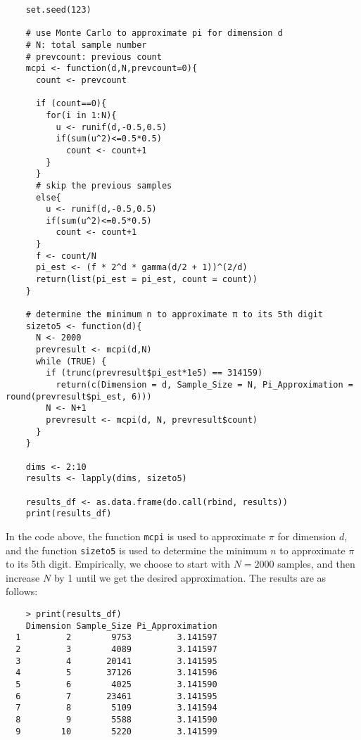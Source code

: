 \documentclass[UTF8]{ctexart}
\begin{document}
\begin{lstlisting}
    set.seed(123)

    # use Monte Carlo to approximate pi for dimension d
    # N: total sample number
    # prevcount: previous count
    mcpi <- function(d,N,prevcount=0){
      count <- prevcount
      
      if (count==0){
        for(i in 1:N){
          u <- runif(d,-0.5,0.5)
          if(sum(u^2)<=0.5*0.5)
            count <- count+1
        }
      }
      # skip the previous samples
      else{
        u <- runif(d,-0.5,0.5)
        if(sum(u^2)<=0.5*0.5)
          count <- count+1
      }
      f <- count/N
      pi_est <- (f * 2^d * gamma(d/2 + 1))^(2/d)
      return(list(pi_est = pi_est, count = count))
    }
    
    # determine the minimum n to approximate π to its 5th digit
    sizeto5 <- function(d){
      N <- 2000
      prevresult <- mcpi(d,N)
      while (TRUE) {
        if (trunc(prevresult$pi_est*1e5) == 314159)
          return(c(Dimension = d, Sample_Size = N, Pi_Approximation = round(prevresult$pi_est, 6)))
        N <- N+1
        prevresult <- mcpi(d, N, prevresult$count)
      }
    }
    
    dims <- 2:10
    results <- lapply(dims, sizeto5)
    
    results_df <- as.data.frame(do.call(rbind, results))
    print(results_df)
\end{lstlisting}
In the code above, the function \texttt{mcpi} is used to approximate $\pi$ for dimension $d$, and the function \texttt{sizeto5} is used to determine the minimum $n$ to approximate $\pi$ to its 5th digit. Empirically, we
choose to start with $N = 2000$ samples, and then increase $N$ by 1 until we get the desired approximation. The results are as follows:
\begin{lstlisting}
    > print(results_df)
    Dimension Sample_Size Pi_Approximation
  1         2        9753         3.141597
  2         3        4089         3.141597
  3         4       20141         3.141595
  4         5       37126         3.141596
  5         6        4025         3.141590
  6         7       23461         3.141595
  7         8        5109         3.141594
  8         9        5588         3.141590
  9        10        5220         3.141599
\end{lstlisting}
\end{document}
